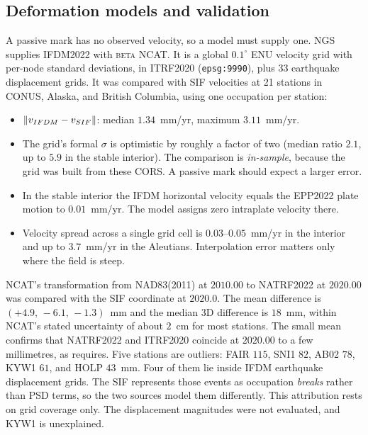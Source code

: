\documentclass[main.tex]{subfiles}
\begin{document}
\subsection{Deformation models and validation}\label{sec:trf-defmodel}

A passive mark has no observed velocity, so a model must supply one.
NGS supplies IFDM2022 with \textsc{beta} NCAT.  It is a global
$0.1^\circ$ ENU velocity grid with per-node standard deviations, in
ITRF2020 (\texttt{epsg:9990}), plus 33 earthquake displacement grids.
It was compared with SIF velocities at 21 stations in CONUS, Alaska,
and British Columbia, using one occupation per station:

\begin{itemize}[leftmargin=*]
\item $\lVert v_{IFDM} - v_{SIF} \rVert$:
      median $1.34$~mm/yr, maximum $3.11$~mm/yr.
\item The grid's formal $\sigma$ is optimistic by roughly a factor of
      two (median ratio $2.1$, up to $5.9$ in the stable interior).
      The comparison is \emph{in-sample}, because the grid was built
      from these CORS.  A passive mark should expect a larger error.
\item In the stable interior the IFDM horizontal velocity equals the
      EPP2022 plate motion to $0.01$~mm/yr.  The model assigns zero
      intraplate velocity there.
\item Velocity spread across a single grid cell is $0.03$--$0.05$~mm/yr
      in the interior and up to $3.7$~mm/yr in the Aleutians.
      Interpolation error matters only where the field is steep.
\end{itemize}

NCAT's transformation from NAD83(2011) at $2010.00$ to NATRF2022 at
$2020.00$ was compared with the SIF coordinate at $2020.0$.  The mean
difference is $(+4.9,\,-6.1,\,-1.3)$~mm and the median 3D difference is
$18$~mm, within NCAT's stated uncertainty of about $2$~cm for most
stations.  The small mean confirms that NATRF2022 and ITRF2020 coincide
at $2020.00$ to a few millimetres, as  requires.
Five stations are outliers: FAIR $115$, SNI1 $82$, AB02 $78$, KYW1 $61$,
and HOLP $43$~mm.  Four of them lie inside IFDM earthquake displacement
grids.  The SIF represents those events as occupation \emph{breaks}
rather than PSD terms, so the two sources model them differently.  This
attribution rests on grid coverage only.  The displacement magnitudes
were not evaluated, and KYW1 is unexplained.
\end{document}
